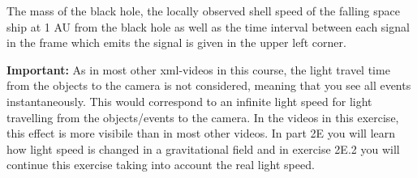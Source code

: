 {\begin{multicols}{2}
The mass of the black hole, the locally observed shell speed of the falling space ship at 1 AU from the black hole as well as the time interval between each signal in the frame which emits the signal is given in the upper left corner.

{\bf Important:} As in most other xml-videos in this course, the light travel time from the objects to the camera is not considered, meaning that you see all events instantaneously. This would correspond to an infinite light speed for light travelling from the objects/events to the camera. In the videos in this exercise, this effect is more visibile than in most other videos. In part 2E you will learn how light speed is changed in a gravitational field and in exercise 2E.2 you will continue this exercise taking into account the real light speed.


\end{multicols}}
